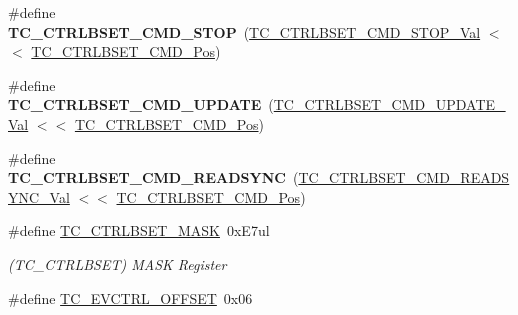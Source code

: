 \begin{DoxyCompactItemize}
\item 
\hypertarget{group___s_a_m_l21___t_c_gaedd7ee97015bf0118ff00a40ac458d29}{}\#define {\bfseries T\+C\+\_\+\+C\+T\+R\+L\+B\+S\+E\+T\+\_\+\+C\+M\+D\+\_\+\+S\+T\+O\+P}~(\hyperlink{group___s_a_m_l21___t_c_gaa4a9a321dfc02191674396c7a2af47a4}{T\+C\+\_\+\+C\+T\+R\+L\+B\+S\+E\+T\+\_\+\+C\+M\+D\+\_\+\+S\+T\+O\+P\+\_\+\+Val}      $<$$<$ \hyperlink{group___s_a_m_l21___t_c_ga300926b23e1f7430a6e8a93d73fd98cc}{T\+C\+\_\+\+C\+T\+R\+L\+B\+S\+E\+T\+\_\+\+C\+M\+D\+\_\+\+Pos})\label{group___s_a_m_l21___t_c_gaedd7ee97015bf0118ff00a40ac458d29}

\item 
\hypertarget{group___s_a_m_l21___t_c_ga4676be34088f993eace865b9682d25fd}{}\#define {\bfseries T\+C\+\_\+\+C\+T\+R\+L\+B\+S\+E\+T\+\_\+\+C\+M\+D\+\_\+\+U\+P\+D\+A\+T\+E}~(\hyperlink{group___s_a_m_l21___t_c_ga2bf06e089fa99c81441c3d4c6c754969}{T\+C\+\_\+\+C\+T\+R\+L\+B\+S\+E\+T\+\_\+\+C\+M\+D\+\_\+\+U\+P\+D\+A\+T\+E\+\_\+\+Val}    $<$$<$ \hyperlink{group___s_a_m_l21___t_c_ga300926b23e1f7430a6e8a93d73fd98cc}{T\+C\+\_\+\+C\+T\+R\+L\+B\+S\+E\+T\+\_\+\+C\+M\+D\+\_\+\+Pos})\label{group___s_a_m_l21___t_c_ga4676be34088f993eace865b9682d25fd}

\item 
\hypertarget{group___s_a_m_l21___t_c_ga6720b1530af4528c23d1913b209980c8}{}\#define {\bfseries T\+C\+\_\+\+C\+T\+R\+L\+B\+S\+E\+T\+\_\+\+C\+M\+D\+\_\+\+R\+E\+A\+D\+S\+Y\+N\+C}~(\hyperlink{group___s_a_m_l21___t_c_ga141775f4a03151dab60349caabb1b571}{T\+C\+\_\+\+C\+T\+R\+L\+B\+S\+E\+T\+\_\+\+C\+M\+D\+\_\+\+R\+E\+A\+D\+S\+Y\+N\+C\+\_\+\+Val}  $<$$<$ \hyperlink{group___s_a_m_l21___t_c_ga300926b23e1f7430a6e8a93d73fd98cc}{T\+C\+\_\+\+C\+T\+R\+L\+B\+S\+E\+T\+\_\+\+C\+M\+D\+\_\+\+Pos})\label{group___s_a_m_l21___t_c_ga6720b1530af4528c23d1913b209980c8}

\item 
\hypertarget{group___s_a_m_l21___t_c_ga64f0fcfecae1a0dc0bcc2bd428b25ef1}{}\#define \hyperlink{group___s_a_m_l21___t_c_ga64f0fcfecae1a0dc0bcc2bd428b25ef1}{T\+C\+\_\+\+C\+T\+R\+L\+B\+S\+E\+T\+\_\+\+M\+A\+S\+K}~0x\+E7ul\label{group___s_a_m_l21___t_c_ga64f0fcfecae1a0dc0bcc2bd428b25ef1}

\begin{DoxyCompactList}\small\item\em (T\+C\+\_\+\+C\+T\+R\+L\+B\+S\+E\+T) M\+A\+S\+K Register \end{DoxyCompactList}\item 
\hypertarget{group___s_a_m_l21___t_c_ga73d8de62d36e71fdb668ff3461dbcc54}{}\#define \hyperlink{group___s_a_m_l21___t_c_ga73d8de62d36e71fdb668ff3461dbcc54}{T\+C\+\_\+\+E\+V\+C\+T\+R\+L\+\_\+\+O\+F\+F\+S\+E\+T}~0x06\label{group___s_a_m_l21___t_c_ga73d8de62d36e71fdb668ff3461dbcc54}


\end{DoxyCompactItemize}
